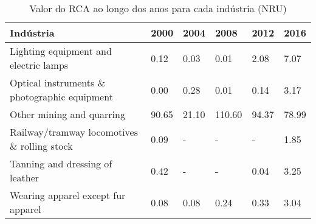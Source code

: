 \begin{table}
\centering
\caption{Valor do RCA ao longo dos anos para cada indústria (NRU)}
\label{tab:ex3-tempo-NRU}
\begin{tabular}{p{6cm}p{1.5cm}p{1.5cm}p{1.5cm}p{1.5cm}p{1.5cm}}
\toprule
                                   Indústria &  2000 &  2004 &   2008 &  2012 &  2016 \\
\midrule
       Lighting equipment and electric lamps &  0.12 &  0.03 &   0.01 &  2.08 &  7.07 \\
Optical instruments \& photographic equipment &  0.00 &  0.28 &   0.01 &  0.14 &  3.17 \\
                   Other mining and quarring & 90.65 & 21.10 & 110.60 & 94.37 & 78.99 \\
 Railway/tramway locomotives \& rolling stock &  0.09 &     - &      - &     - &  1.85 \\
             Tanning and dressing of leather &  0.42 &     - &      - &  0.04 &  3.25 \\
          Wearing apparel except fur apparel &  0.08 &  0.08 &   0.24 &  0.33 &  3.04 \\
\bottomrule
\end{tabular}
\end{table}
